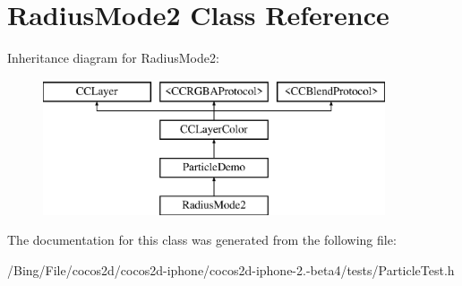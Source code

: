 \hypertarget{interface_radius_mode2}{\section{Radius\-Mode2 Class Reference}
\label{interface_radius_mode2}
}
Inheritance diagram for Radius\-Mode2\-:\begin{figure}[H]
\begin{center}
\leavevmode
\includegraphics[height=4.000000cm]{interface_radius_mode2}
\end{center}
\end{figure}


The documentation for this class was generated from the following file\-:\begin{DoxyCompactItemize}
\item 
/\-Bing/\-File/cocos2d/cocos2d-\/iphone/cocos2d-\/iphone-\/2.-\/beta4/tests/Particle\-Test.\-h\end{DoxyCompactItemize}

